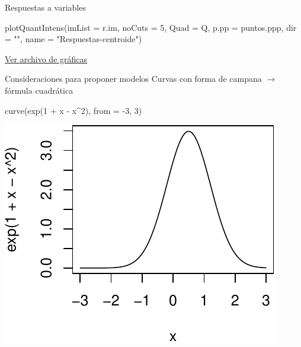 \documentclass[
  11pt,
  ignorenonframetext,
]{beamer}
\newenvironment{Shaded}{}{}
\newcommand{\AttributeTok}[1]{\textcolor[rgb]{0.49,0.56,0.16}{#1}}
\newcommand{\DecValTok}[1]{\textcolor[rgb]{0.25,0.63,0.44}{#1}}
\newcommand{\FunctionTok}[1]{\textcolor[rgb]{0.02,0.16,0.49}{#1}}
\newcommand{\NormalTok}[1]{#1}
\newcommand{\SpecialCharTok}[1]{\textcolor[rgb]{0.25,0.44,0.63}{#1}}
\newcommand{\StringTok}[1]{\textcolor[rgb]{0.25,0.44,0.63}{#1}}
\begin{document}
\begin{frame}[fragile]{Respuestas a variables}
\protect\hypertarget{respuestas-a-variables}{}
\begin{Shaded}
\begin{Highlighting}[]
\FunctionTok{plotQuantIntens}\NormalTok{(}\AttributeTok{imList =}\NormalTok{ r.im,}
                \AttributeTok{noCuts =} \DecValTok{5}\NormalTok{,}
                \AttributeTok{Quad =}\NormalTok{ Q,}
                \AttributeTok{p.pp =}\NormalTok{ puntos.ppp,}
                \AttributeTok{dir =} \StringTok{""}\NormalTok{,}
                \AttributeTok{name =} \StringTok{"Respuestas{-}centroide"}\NormalTok{)}
\end{Highlighting}
\end{Shaded}

\href{Respuestas-centroide.pdf}{Ver archivo de gráficas}
\end{frame}

\begin{frame}[fragile]{Consideraciones para proponer modelos}
\protect\hypertarget{consideraciones-para-proponer-modelos}{}
Curvas con forma de campana \(\rightarrow\) fórmula cuadrática

\begin{Shaded}
\begin{Highlighting}[]
\FunctionTok{curve}\NormalTok{(}\FunctionTok{exp}\NormalTok{(}\DecValTok{1} \SpecialCharTok{+}\NormalTok{ x }\SpecialCharTok{{-}}\NormalTok{ x}\SpecialCharTok{\^{}}\DecValTok{2}\NormalTok{), }\AttributeTok{from =} \SpecialCharTok{{-}}\DecValTok{3}\NormalTok{, }\DecValTok{3}\NormalTok{)}
\end{Highlighting}
\end{Shaded}

\includegraphics{Tutorial-spatstat-2_files/figure-beamer/unnamed-chunk-12-1.pdf}
\end{frame}
\end{document}
